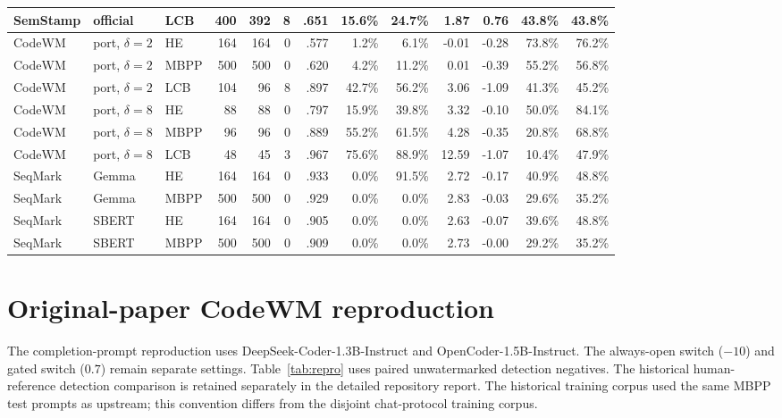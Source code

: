 \documentclass[11pt]{article}
\begin{document}
\begin{longtable}{lllrrrrrrrrrr}
SemStamp & official & LCB & 400 & 392 & 8 & .651 & 15.6\% & 24.7\% & 1.87 & 0.76 & 43.8\% & 43.8\% \\
\midrule
CodeWM & port, $\delta=2$ & HE & 164 & 164 & 0 & .577 & 1.2\% & 6.1\% & -0.01 & -0.28 & 73.8\% & 76.2\% \\
CodeWM & port, $\delta=2$ & MBPP & 500 & 500 & 0 & .620 & 4.2\% & 11.2\% & 0.01 & -0.39 & 55.2\% & 56.8\% \\
CodeWM & port, $\delta=2$ & LCB & 104 & 96 & 8 & .897 & 42.7\% & 56.2\% & 3.06 & -1.09 & 41.3\% & 45.2\% \\
CodeWM & port, $\delta=8$ & HE & 88 & 88 & 0 & .797 & 15.9\% & 39.8\% & 3.32 & -0.10 & 50.0\% & 84.1\% \\
CodeWM & port, $\delta=8$ & MBPP & 96 & 96 & 0 & .889 & 55.2\% & 61.5\% & 4.28 & -0.35 & 20.8\% & 68.8\% \\
CodeWM & port, $\delta=8$ & LCB & 48 & 45 & 3 & .967 & 75.6\% & 88.9\% & 12.59 & -1.07 & 10.4\% & 47.9\% \\
\midrule
SeqMark & Gemma & HE & 164 & 164 & 0 & .933 & 0.0\% & 91.5\% & 2.72 & -0.17 & 40.9\% & 48.8\% \\
SeqMark & Gemma & MBPP & 500 & 500 & 0 & .929 & 0.0\% & 0.0\% & 2.83 & -0.03 & 29.6\% & 35.2\% \\
SeqMark & SBERT & HE & 164 & 164 & 0 & .905 & 0.0\% & 0.0\% & 2.63 & -0.07 & 39.6\% & 48.8\% \\
SeqMark & SBERT & MBPP & 500 & 500 & 0 & .909 & 0.0\% & 0.0\% & 2.73 & -0.00 & 29.2\% & 35.2\% \\
\bottomrule
\end{longtable}
\normalsize

\section{Original-paper CodeWM reproduction}

The completion-prompt reproduction uses DeepSeek-Coder-1.3B-Instruct and
OpenCoder-1.5B-Instruct. The always-open switch ($-10$) and gated switch
($0.7$) remain separate settings. Table~\ref{tab:repro} uses paired
unwatermarked detection negatives. The historical human-reference detection
comparison is retained separately in the detailed repository report.
The historical training corpus used the same MBPP test prompts as upstream;
this convention differs from the disjoint chat-protocol training corpus.
\end{document}
